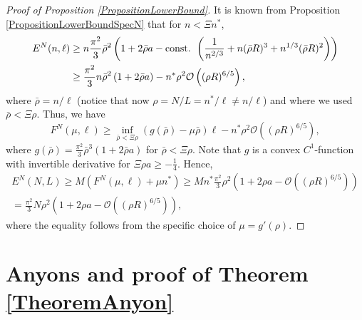 \documentclass[a4paper,11pt]{article}
\numberwithin{equation}{section}
\begin{document}
\begin{proof}[Proof of Proposition \ref{PropositionLowerBound}]
			It is known from Proposition \ref{PropositionLowerBoundSpecN} that for $ n<\Xi n^* $,  \begin{equation}
			\begin{aligned}
			E^{N}(n,\ell)&\geq n\frac{\pi^2}{3}\bar{\rho}^2\left(1+2\bar{\rho} a-\textnormal{const. }\left(\frac{1}{n^{2/3}}+n(\bar{\rho} R)^3+n^{1/3}(\bar{\rho} R)^2\right)\right)\\
			&\geq \frac{\pi^2}{3}n\bar{\rho}^2\left(1+2\bar{\rho}a\right)-n^*\rho^2\mathcal{O}\left((\rho R)^{6/5}\right),
			\end{aligned}
			\end{equation}
			where $ \bar{\rho}=n/\ell $ (notice that now $ \rho=N/L=n^\ast/\ell\neq n/\ell $) and where we used $ \bar{\rho}<\Xi\rho$.
			Thus, we have \begin{equation}
			F^{N}(\mu,\ell)\geq \inf_{\bar{\rho}<\Xi\rho}(g(\bar{\rho})-\mu\bar{\rho})\ell-n^\ast \rho^2 \mathcal{O}\left((\rho R)^{6/5}\right),
			\end{equation}
			where $
			g(\bar{\rho})=
			\frac{\pi^2}{3}\bar{\rho}^3\left(1+2\bar{\rho}a\right)
			$ for $ \bar{\rho}<\Xi\rho $. Note that $ g $ is a convex $ C^{1} $-function with invertible derivative for $ \Xi\rho a\geq -\frac{1}{4}  $. Hence, \begin{equation}
			\begin{aligned}
			E^{N}(N,L)\geq M(F^{N}(\mu,\ell)+\mu n^*)\geq Mn^\ast\frac{\pi^2}{3} \rho^2 \left(1+2\rho a-\mathcal{O}\left((\rho R)^{6/5}\right)\right)\\
			=\frac{\pi^2}{3} N\rho^2 \left(1+2\rho a-\mathcal{O}\left((\rho R)^{6/5}\right)\right),
			\end{aligned}
			\end{equation}
			where the equality follows from the specific choice of $ \mu=g'(\rho) $.
		\end{proof}
		
\section{Anyons and proof of Theorem \ref{TheoremAnyon}}
\label{SectionOtherSymmetries}
\end{document}
